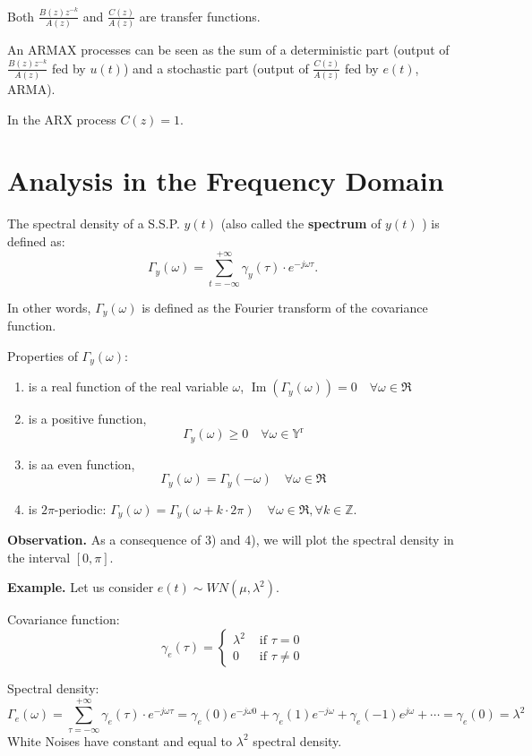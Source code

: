 Both $\frac{B(z) z^{-k}}{A(z)}$ and $\frac{C(z)}{A(z)}$ are transfer functions.

An ARMAX processes can be seen as the sum of a deterministic part (output of $\frac{B(z) z^{-k}}{A(z)}$ fed by $u(t)$) and a stochastic part (output of $\frac{C(z)}{A(z)}$ fed by $e(t)$, ARMA).

In the ARX process $C(z)=1$.

\section{Analysis in the Frequency Domain}
\begin{definition}
	The spectral density of a S.S.P. $y(t)$ (also called the \textbf{spectrum} of $y(t)$ ) is defined as:
	\[
		\Gamma_{y}(\omega)=\sum_{t=-\infty}^{+\infty} \gamma_{y}(\tau) \cdot e^{-j \omega \tau}.
	\]
\end{definition}

In other words, $\Gamma_y(\omega)$ is defined as the Fourier transform of the covariance function.

Properties of $\Gamma_{y}(\omega)$:
\begin{enumerate}
	\item is a real function of the real variable $\omega$, $\operatorname{Im}\left(\Gamma_{y}(\omega)\right)=0 \quad \forall \omega \in \Re$
	\item is a positive function,
	$$
		\Gamma_{y}(\omega) \geq 0 \quad \forall \omega \in \mathbb{Y}^{\mathrm{r}}
	$$
	\item is aa even function,
	$$
		\Gamma_{y}(\omega)=\Gamma_{y}(-\omega) \quad \forall \omega \in \Re
	$$
	\item is $2\pi$-periodic: $\Gamma_{y}(\omega)=\Gamma_{y}(\omega+k \cdot 2 \pi) \quad \forall \omega \in \Re, \forall k \in \mathbb{Z}$.
\end{enumerate}

\textbf{Observation.}
As a consequence of 3) and 4), we will plot the spectral density in the interval $[0, \pi]$.

\textbf{Example.}
Let us consider $e(t) \sim W N\left(\mu, \lambda^{2}\right)$. 

Covariance function:
\[
	\gamma_{e}(\tau)= \begin{cases}\lambda^{2} & \text { if } \tau=0 \\ 0 & \text { if } \tau \neq 0\end{cases}
\]


Spectral density:
\[
	\Gamma_{e}(\omega) =\sum_{\tau=-\infty}^{+\infty} \gamma_{e}(\tau) \cdot e^{-j \omega \tau}=\gamma_{e}(0) e^{-j \omega 0}+\gamma_{e}(1) e^{-j \omega}+\gamma_{e}(-1) e^{j \omega}+\cdots=\gamma_{e}(0)=\lambda^{2}
\]
White Noises have constant and equal to $\lambda^{2}$ spectral density.

